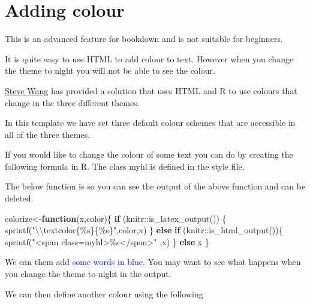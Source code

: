 \documentclass[
  letterpaper,
  oneside]{book}
\newenvironment{Shaded}{\begin{snugshade}}{\end{snugshade}}
\newcommand{\ControlFlowTok}[1]{\textcolor[rgb]{0.00,0.23,0.31}{\textbf{#1}}}
\newcommand{\FunctionTok}[1]{\textcolor[rgb]{0.28,0.35,0.67}{#1}}
\newcommand{\NormalTok}[1]{\textcolor[rgb]{0.00,0.23,0.31}{#1}}
\newcommand{\OtherTok}[1]{\textcolor[rgb]{0.00,0.23,0.31}{#1}}
\newcommand{\SpecialCharTok}[1]{\textcolor[rgb]{0.37,0.37,0.37}{#1}}
\newcommand{\StringTok}[1]{\textcolor[rgb]{0.13,0.47,0.30}{#1}}
\numberwithin{equation}{section}
\numberwithin{figure}{section}
\theoremstyle{break}
\theoremstyle{plain}
\theoremstyle{remark}
\begin{document}

\chapter{Adding colour}\label{adding-colour}

This is an advanced feature for bookdown and is not suitable for
beginners.

It is quite easy to use HTML to add {colour to text.} However when you
change the theme to night you will not be able to see the colour.

\href{https://www.nottingham.ac.uk/biosciences/people/qingqi.wang}{Steve
Wang} has provided a solution that uses HTML and R to use colours that
change in the three different themes.

In this template we have set three default colour schemes that are
accessible in all of the three themes.

If you would like to change the colour of some text you can do by
creating the following formula in R. The class myhl is defined in the
style file.

The below function is so you can see the output of the above function
and can be deleted.

\begin{Shaded}
\begin{Highlighting}[]
\NormalTok{colorize}\OtherTok{\textless{}{-}}\ControlFlowTok{function}\NormalTok{(x,color)\{}
  \ControlFlowTok{if}\NormalTok{ (knitr}\SpecialCharTok{::}\FunctionTok{is\_latex\_output}\NormalTok{()) \{}
    \FunctionTok{sprintf}\NormalTok{(}\StringTok{"}\SpecialCharTok{\textbackslash{}\textbackslash{}}\StringTok{textcolor\{\%s\}\{\%s\}"}\NormalTok{,color,x)}
\NormalTok{  \} }\ControlFlowTok{else} \ControlFlowTok{if}\NormalTok{ (knitr}\SpecialCharTok{::}\FunctionTok{is\_html\_output}\NormalTok{())\{}
    \FunctionTok{sprintf}\NormalTok{(}\StringTok{"\textless{}span class=\textquotesingle{}myhl\textquotesingle{}\textgreater{}\%s\textless{}/span\textgreater{}"}\NormalTok{ ,x)}
\NormalTok{  \} }\ControlFlowTok{else}\NormalTok{ x}
\NormalTok{\}}
\end{Highlighting}
\end{Shaded}

We can them add \textcolor{blue}{some words in blue.} You may want to
see what happens when you change the theme to night in the output.

We can then define another colour using the following
\end{document}

